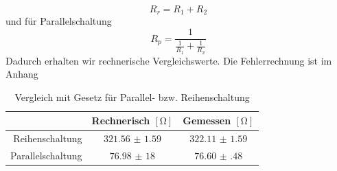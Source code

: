 \begin{equation*}
	R_r = R_1 + R_2
\end{equation*}
und für Parallelschaltung
\begin{equation*}
	R_p = \frac{1}{\frac{1}{R_1} + \frac{1}{R_2}}
\end{equation*}
Dadurch erhalten wir rechnerische Vergleichswerte. Die Fehlerrechnung ist im Anhang
\begin{table}[H]
	\centering
	\begin{tabular}{r|cc}
			& Rechnerisch $ [\si{\ohm}] $ & Gemessen $ [\si{\ohm}] $ \\\hline
			Reihenschaltung & $ \num{321.56(159)} $ & $ \num{322.11(159)} $\\
			Parallelschaltung & $ \num{76,98(18)} $ & $ \num{76.60(48)} $
	\end{tabular}
	\caption{Vergleich mit Gesetz für Parallel- bzw. Reihenschaltung}
\end{table}


